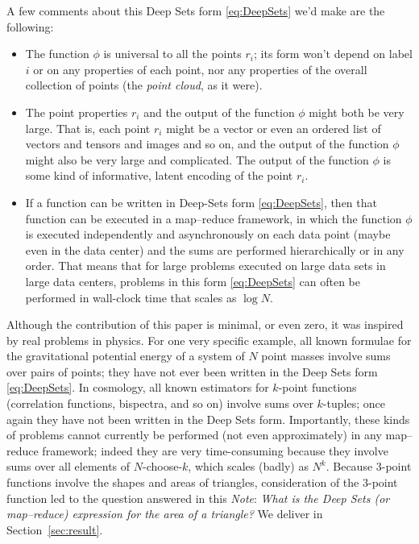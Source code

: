 \documentclass[12pt]{article}
\newcommand{\documentname}{\textsl{Note}}
\newcommand{\sectionname}{Section}
\newcommand{\secref}[1]{\sectionname~\ref{#1}}
\begin{document}
A few comments about this Deep Sets form \eqref{eq:DeepSets} we'd make are the following:
\begin{itemize}
    \item The function $\phi$ is universal to all the points $r_i$; its form won't depend on label $i$ or on any properties of each point, nor any properties of the overall collection of points (the \emph{point cloud}, as it were).
    \item The point properties $r_i$ and the output of the function $\phi$ might both be very large.
    That is, each point $r_i$ might be a vector or even an ordered list of vectors and tensors and images and so on, and the output of the function $\phi$ might also be very large and complicated.
    The output of the function $\phi$ is some kind of informative, latent encoding of the point $r_i$.
    \item If a function can be written in Deep-Sets form \eqref{eq:DeepSets}, then that function can be executed in a map--reduce framework, in which the function $\phi$ is executed independently and asynchronously on each data point (maybe even in the data center) and the sums are performed hierarchically or in any order.
    That means that for large problems executed on large data sets in large data centers, problems in this form \eqref{eq:DeepSets} can often be performed in wall-clock time that scales as $\log N$.
\end{itemize}

Although the contribution of this paper is minimal, or even zero, it was inspired by real problems in physics.
For one very specific example, all known formulae for the gravitational potential energy of a system of $N$ point masses involve sums over pairs of points; they have not ever been written in the Deep Sets form \eqref{eq:DeepSets}.
In cosmology, all known estimators for $k$-point functions (correlation functions, bispectra, and so on) involve sums over $k$-tuples; once again they have not been written in the Deep Sets form.
Importantly, these kinds of problems cannot currently be performed (not even approximately) in any map--reduce framework; indeed they are very time-consuming because they involve sums over all elements of $N$-choose-$k$, which scales (badly) as $N^k$.
Because 3-point functions involve the shapes and areas of triangles, consideration of the 3-point function led to the question answered in this \documentname:
\emph{What is the Deep Sets (or map--reduce) expression for the area of a triangle?}
We deliver in \secref{sec:result}.
\end{document}

